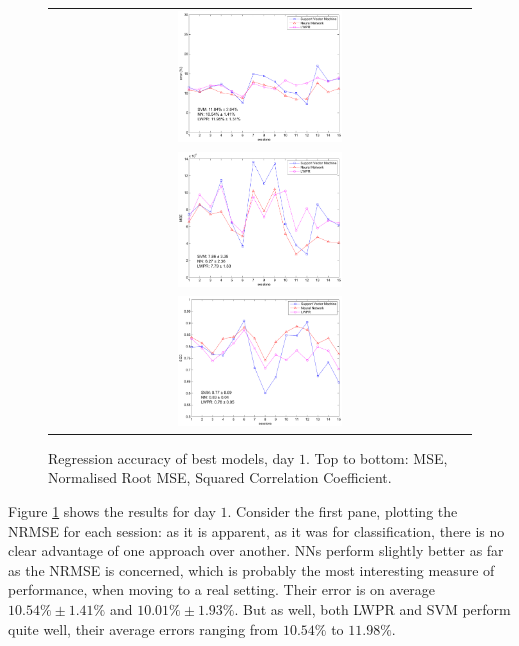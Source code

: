 \begin{figure}\centering
  \begin{tabular}{c}
    \includegraphics[width=0.4\textwidth]{figs/fig_err_regr_resCrossBestOnDay1}\\
    \includegraphics[width=0.4\textwidth]{figs/fig_MSE_regr_resCrossBestOnDay1} \\
    \includegraphics[width=0.4\textwidth]{figs/fig_SCC_regr_resCrossBestOnDay1} \\
  \end{tabular}
  \caption{Regression accuracy of best models, day $1$. Top to bottom:
    MSE, Normalised Root MSE, Squared Correlation Coefficient.}
  \label{fig:best_regr}
\end{figure}

Figure \ref{fig:best_regr} shows the results for day $1$. Consider the
first pane, plotting the NRMSE for each session: as it is apparent, as
it was for classification, there is no clear advantage of one approach
over another. NNs perform slightly better as far as the NRMSE is
concerned, which is probably the most interesting measure of
performance, when moving to a real setting. Their error is on average
$10.54\% \pm 1.41\%$ and $10.01\% \pm 1.93\%$. But as well, both LWPR
and SVM perform quite well, their average errors ranging from
$10.54\%$ to $11.98\%$.

